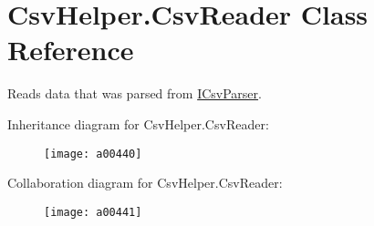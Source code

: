 \hypertarget{a00079}{\section{Csv\-Helper.\-Csv\-Reader Class Reference}
\label{a00079}
}


Reads data that was parsed from \hyperlink{a00115}{I\-Csv\-Parser}.  




Inheritance diagram for Csv\-Helper.\-Csv\-Reader\-:
\nopagebreak
\begin{figure}[H]
\begin{center}
\leavevmode
\texttt{[image: a00440]}
\end{center}
\end{figure}


Collaboration diagram for Csv\-Helper.\-Csv\-Reader\-:
\nopagebreak
\begin{figure}[H]
\begin{center}
\leavevmode
\texttt{[image: a00441]}
\end{center}
\end{figure}
